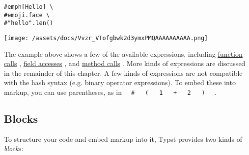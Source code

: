 \begin{verbatim}
#emph[Hello] \
#emoji.face \
#"hello".len()
\end{verbatim}

\texttt{[image: /assets/docs/Vvzr\_VTofgbwk2d3ymxPMQAAAAAAAAAA.png]}

The example above shows a few of the available expressions, including
\href{/docs/reference/foundations/function/}{function calls} ,
\href{/docs/reference/scripting/\#fields}{field accesses} , and
\href{/docs/reference/scripting/\#methods}{method calls} . More kinds of
expressions are discussed in the remainder of this chapter. A few kinds
of expressions are not compatible with the hash syntax (e.g. binary
operator expressions). To embed these into markup, you can use
parentheses, as in
\texttt{\ }{\texttt{\ \#\ }}\texttt{\ }{\texttt{\ (\ }}\texttt{\ }{\texttt{\ 1\ }}\texttt{\ }{\texttt{\ +\ }}\texttt{\ }{\texttt{\ 2\ }}\texttt{\ }{\texttt{\ )\ }}\texttt{\ }
.

\subsection{Blocks}\label{blocks}

To structure your code and embed markup into it, Typst provides two
kinds of \emph{blocks:}

